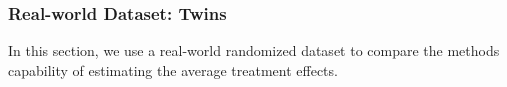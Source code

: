 \documentclass[letterpaper]{article} %
\begin{document}
%		
\subsubsection{Real-world Dataset: Twins}
In this section, we use a real-world randomized dataset to compare the methods capability of estimating the average treatment effects. 
\end{document}
